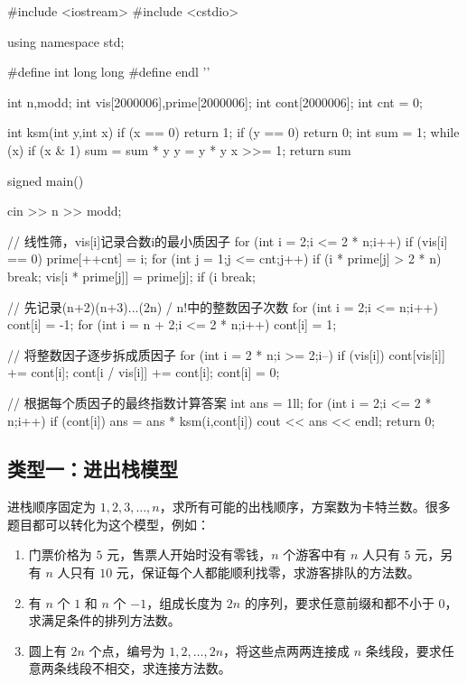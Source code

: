 \documentclass[UTF8,a4paper,11pt]{ctexart}
\begin{document}
\begin{CodeBlock}
#include <iostream>
#include <cstdio>

using namespace std;

#define int long long
#define endl '\n'

int n,modd;
int vis[2000006],prime[2000006];
int cont[2000006];
int cnt = 0;

int ksm(int y,int x) {
    if (x == 0)
        return 1;
    if (y == 0)
        return 0;
    int sum = 1;
    while (x) {
        if (x & 1)
            sum = sum * y %
        y = y * y %
        x >>= 1;
    }
    return sum %
}

signed main() {
    cin >> n >> modd;

    // 线性筛，vis[i]记录合数i的最小质因子
    for (int i = 2;i <= 2 * n;i++) {
        if (vis[i] == 0)
            prime[++cnt] = i;
        for (int j = 1;j <= cnt;j++) {
            if (i * prime[j] > 2 * n)
                break;
            vis[i * prime[j]] = prime[j];
            if (i %
                break;
        }
    }

    // 先记录(n+2)(n+3)...(2n) / n!中的整数因子次数
    for (int i = 2;i <= n;i++)
        cont[i] = -1;
    for (int i = n + 2;i <= 2 * n;i++)
        cont[i] = 1;

    // 将整数因子逐步拆成质因子
    for (int i = 2 * n;i >= 2;i--) {
        if (vis[i]) {
            cont[vis[i]] += cont[i];
            cont[i / vis[i]] += cont[i];
            cont[i] = 0;
        }
    }

    // 根据每个质因子的最终指数计算答案
    int ans = 1ll;
    for (int i = 2;i <= 2 * n;i++) {
        if (cont[i])
            ans = ans * ksm(i,cont[i]) %
    }
    cout << ans << endl;
    return 0;
}
\end{CodeBlock}

\subsection{类型一：进出栈模型}

进栈顺序固定为 $1,2,3,\ldots,n$，求所有可能的出栈顺序，方案数为卡特兰数。很多题目都可以转化为这个模型，例如：

\begin{enumerate}
    \item 门票价格为 $5$ 元，售票人开始时没有零钱，$n$ 个游客中有 $n$ 人只有 $5$ 元，另有 $n$ 人只有 $10$ 元，保证每个人都能顺利找零，求游客排队的方法数。
    \item 有 $n$ 个 $1$ 和 $n$ 个 $-1$，组成长度为 $2n$ 的序列，要求任意前缀和都不小于 $0$，求满足条件的排列方法数。
    \item 圆上有 $2n$ 个点，编号为 $1,2,\ldots,2n$，将这些点两两连接成 $n$ 条线段，要求任意两条线段不相交，求连接方法数。
\end{enumerate}
\end{document}
